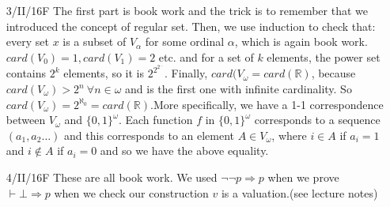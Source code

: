 \begin{enumerate}
\item[3/II/16F] The first part is book work and the trick is to remember that we introduced the concept of regular set. Then, we use induction to check that: every set $x$ is a subset of $V_\alpha$ for some ordinal $\alpha$, which is again book work. $card(V_0)=1, card(V_1)=2$ etc. and for a set of $k$ elements, the power set contains $2^k$ elements, so it is $2^{2^{2^{\ldots}}}$. Finally, $card(V_{\omega}=card(\mathbb{R})$, because $card(V_\omega) > 2^n~\forall n \in \omega$ and is the first one with infinite cardinality. So $card(V_\omega)=2^{\aleph_0}=card(\mathbb{R})$.More specifically, we have a 1-1 correspondence between $V_\omega$ and $\{0,1\}^\omega$. Each function $f$ in $\{0,1\}^\omega$ corresponds to a sequence $(a_1,a_2 \ldots)$ and this corresponds to an element $A \in V_\omega$, where $i \in A$ if $a_i=1$ and $i \not \in A$ if $a_i=0$ and so we have the above equality.\\
\item[4/II/16F] These are all book work. We used $\neg \neg p \Rightarrow p$ when we prove $\vdash \bot \Rightarrow p$ when we check our construction $v$ is a valuation.(see lecture notes)
\end{enumerate}
